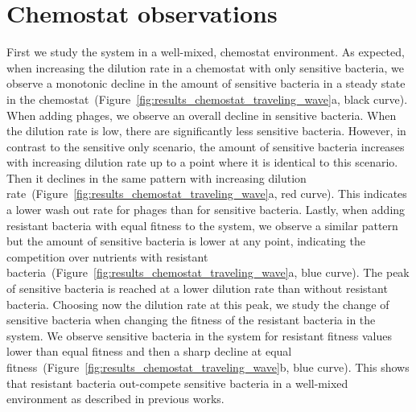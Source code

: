 \section{Chemostat observations}
First we study the system in a well-mixed, chemostat environment. As expected, when increasing the dilution rate in a chemostat with only sensitive bacteria, we observe a monotonic decline in the amount of sensitive bacteria in a steady state in the chemostat~(Figure~\ref{fig:results_chemostat_traveling_wave}a, black curve). When adding phages, we observe an overall decline in sensitive bacteria. When the dilution rate is low, there are significantly less sensitive bacteria. However, in contrast to the sensitive only scenario, the amount of sensitive bacteria increases with increasing dilution rate up to a point where it is identical to this scenario. Then it declines in the same pattern with increasing dilution rate~(Figure~\ref{fig:results_chemostat_traveling_wave}a, red curve). This indicates a lower wash out rate for phages than for sensitive bacteria. Lastly, when adding resistant bacteria with equal fitness to the system, we observe a similar pattern but the amount of sensitive bacteria is lower at any point, indicating the competition over nutrients with resistant bacteria~(Figure~\ref{fig:results_chemostat_traveling_wave}a, blue curve). The peak of sensitive bacteria is reached at a lower dilution rate than without resistant bacteria. Choosing now the dilution rate at this peak, we study the change of sensitive bacteria when changing the fitness of the resistant bacteria in the system. We observe sensitive bacteria in the system for resistant fitness values lower than equal fitness and then a sharp decline at equal fitness~(Figure~\ref{fig:results_chemostat_traveling_wave}b, blue curve). This shows that resistant bacteria out-compete sensitive bacteria in a well-mixed environment as described in previous works.
